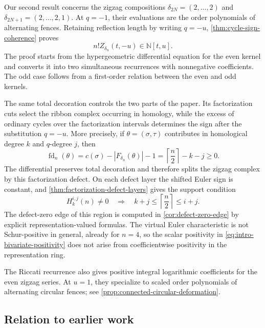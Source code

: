 \documentclass{amsart}
\theoremstyle{definition}
\theoremstyle{remark}
\begin{document}
Our second result concerns the zigzag compositions
$\delta_{2N}=(2,\ldots,2)$ and
$\delta_{2N+1}=(2,\ldots,2,1)$.  At $q=-1$, their evaluations are the order
polynomials of alternating fences.  Retaining reflection length by writing
$q=-u$, \cref{thm:cycle-sign-coherence} proves
\begin{equation}
 n!Z_{\delta_n}(t,-u)\in\mathbb N[t,u].
 \label{eq:intro-bivariate-positivity}
\end{equation}
The proof starts from the hypergeometric differential equation for the even
kernel and converts it into two simultaneous recurrences with nonnegative
coefficients.  The odd case follows from a first-order relation between the
even and odd kernels.

The same total decoration controls the two parts of the paper.  Its
factorization cuts select the ribbon complex occurring in homology, while the
excess of ordinary cycles over the factorization intervals determines the
sign after the substitution $q=-u$.  More precisely, if
$\theta=(\sigma,\tau)$ contributes in homological degree $k$ and
$q$-degree $j$, then
\[
 \operatorname{fd}_n(\theta)
 =c(\sigma)-|F_{\delta_n}(\theta)|-1
 =\left\lceil\frac n2\right\rceil-k-j\geq0.
\]
The differential preserves total decoration and therefore splits the zigzag
complex by this factorization defect.  On each defect layer the shifted Euler
sign is constant, and \cref{thm:factorization-defect-layers} gives the support
condition
\[
 H_k^{i,j}(n)\neq0
 \quad\Longrightarrow\quad
 k+j\leq\left\lceil\frac n2\right\rceil\leq i+j.
\]
The defect-zero edge of this region is computed in
\cref{cor:defect-zero-edge} by explicit representation-valued formulas.  The
virtual Euler characteristic is not Schur-positive in general, already for
$n=4$, so the scalar positivity in \eqref{eq:intro-bivariate-positivity} does
not arise from coefficientwise positivity in the representation ring.

The Riccati recurrence also gives positive integral logarithmic coefficients
for the even zigzag series.  At $u=1$, they specialize to scaled order
polynomials of alternating circular fences; see
\cref{prop:connected-circular-deformation}.

\subsection*{Relation to earlier work}
\end{document}
